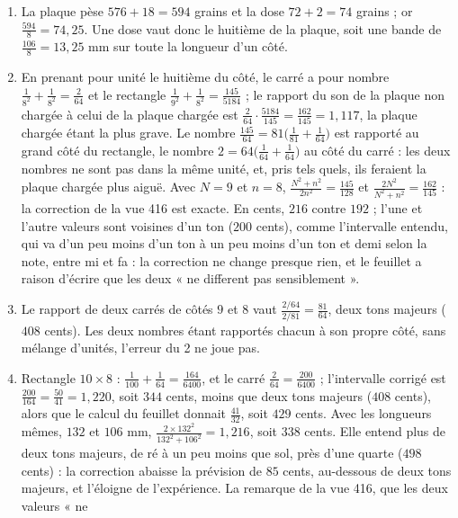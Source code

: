 \documentclass[11pt,a4paper]{article}
\begin{document}
\begin{solution}
\begin{enumerate}
\item La plaque pèse $576 + 18 = 594$ grains et la dose $72 + 2 = 74$ grains ; or
  $\frac{594}{8} = 74{,}25$. Une dose vaut donc le huitième de la plaque, soit une bande
  de $\frac{106}{8} = 13{,}25$ mm sur toute la longueur d'un côté.
\item En prenant pour unité le huitième du côté, le carré a pour nombre
  $\frac1{8^2} + \frac1{8^2} = \frac{2}{64}$ et le rectangle $\frac1{9^2} + \frac1{8^2} =
  \frac{145}{5184}$ ; le rapport du son de la plaque non chargée à celui de la plaque
  chargée est $\frac{2}{64}\cdot\frac{5184}{145} = \frac{162}{145} = 1{,}117$, la
  plaque chargée étant la plus grave. Le nombre $\frac{145}{64} = 81\bigl(\frac1{81} +
  \frac1{64}\bigr)$ est rapporté au grand côté du rectangle, le nombre
  $2 = 64\bigl(\frac1{64} + \frac1{64}\bigr)$ au côté du carré : les deux nombres ne sont
  pas dans la même unité, et, pris tels quels, ils feraient la plaque chargée plus
  aiguë. Avec $N = 9$ et $n = 8$, $\frac{N^2+n^2}{2n^2} = \frac{145}{128}$ et
  $\frac{2N^2}{N^2+n^2} = \frac{162}{145}$ : la correction de la vue 416 est exacte.
  En cents, $216$ contre $192$ ; l'une et l'autre valeurs sont voisines d'un ton
  ($200$ cents), comme l'intervalle entendu, qui va d'un peu moins d'un ton à un peu
  moins d'un ton et demi selon la note, entre mi et fa : la correction ne change presque rien, et le feuillet a raison d'écrire que les deux « ne different pas
  sensiblement ».
\item Le rapport de deux carrés de côtés $9$ et $8$ vaut $\frac{2/64}{2/81} =
  \frac{81}{64}$, deux tons majeurs ($408$ cents). Les deux nombres étant rapportés
  chacun à son propre côté, sans mélange d'unités, l'erreur du 2 ne joue pas.
\item Rectangle $10 \times 8$ : $\frac1{100} + \frac1{64} = \frac{164}{6400}$, et le
  carré $\frac{2}{64} = \frac{200}{6400}$ ; l'intervalle corrigé est
  $\frac{200}{164} = \frac{50}{41} = 1{,}220$, soit $344$ cents, moins que deux tons
  majeurs ($408$ cents), alors que le calcul du feuillet donnait $\frac{41}{32}$, soit
  $429$ cents. Avec les longueurs mêmes, $132$ et $106$ mm,
  $\frac{2\times132^2}{132^2 + 106^2} = 1{,}216$, soit $338$ cents. Elle entend plus de
  deux tons majeurs, de ré à un peu moins que sol, près d'une quarte ($498$ cents) : la
  correction abaisse la prévision de $85$ cents, au-dessous de deux tons majeurs, et
  l'éloigne de l'expérience. La remarque de la vue 416, que les deux valeurs « ne

\end{enumerate}
\end{solution}
\end{document}
